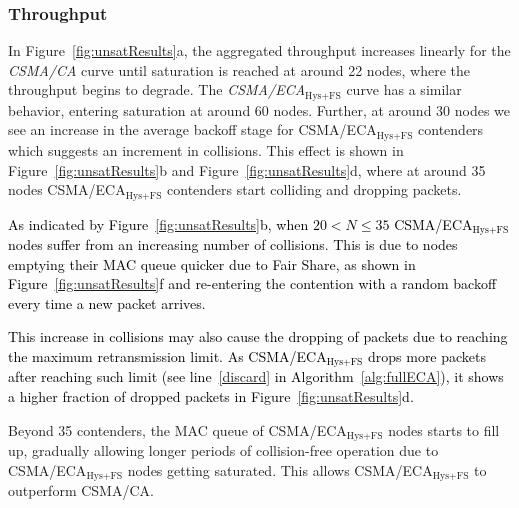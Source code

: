 	\subsubsection{Throughput}
	
	
	In Figure~\ref{fig:unsatResults}a, the aggregated throughput increases linearly for the \emph{CSMA/CA} curve until saturation is reached at around 22 nodes, where the throughput begins to degrade. The \emph{CSMA/ECA$_{\text{Hys+FS}}$} curve has a similar behavior, entering saturation at around 60 nodes. Further, at around 30 nodes we see an increase in the average backoff stage for CSMA/ECA$_{\text{Hys+FS}}$ contenders which suggests an increment in collisions. This effect is shown in Figure~\ref{fig:unsatResults}b and Figure~\ref{fig:unsatResults}d, where at around 35 nodes CSMA/ECA$_{\text{Hys+FS}}$ contenders start colliding and dropping packets. 
	
	\textcolor{black}{As indicated by Figure~\ref{fig:unsatResults}b, when $20<N\leq 35$ CSMA/ECA$_{\text{Hys+FS}}$ nodes suffer from an increasing number of  collisions. This is due to nodes emptying their MAC queue quicker due to Fair Share, as shown in Figure~\ref{fig:unsatResults}f and re-entering the contention with a random backoff every time a new packet arrives.} 
	
	\textcolor{black}{This increase in collisions may also cause the dropping of packets due to reaching the maximum retransmission limit. As CSMA/ECA$_{\text{Hys+FS}}$ drops more packets after reaching such limit (see line~\ref{discard} in Algorithm~\ref{alg:fullECA}), it shows a higher fraction of dropped packets in Figure~\ref{fig:unsatResults}d.}
	
	Beyond 35 contenders, the MAC queue of CSMA/ECA$_{\text{Hys+FS}}$ nodes starts to fill up, gradually allowing longer periods of collision-free operation due to CSMA/ECA$_{\text{Hys+FS}}$ nodes getting saturated. This allows CSMA/ECA$_{\text{Hys+FS}}$ to outperform CSMA/CA.\\
	
